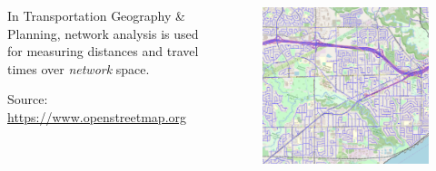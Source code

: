 \documentclass[aspectratio=169]{beamer}
\begin{document}
\begin{frame}

	
	\begin{columns}
		\begin{column}{0.5\textwidth}
			In Transportation Geography \& Planning, network analysis is used for measuring distances and travel times over \textit{network} space. \\
			\vspace{4mm}
			
			\tiny Source: \url{https://www.openstreetmap.org}
		\end{column}
		\begin{column}{0.5\textwidth}
			
			\begin{figure}
				\centering
				\includegraphics[width=1\linewidth]{images/utsc_roads_network}
			\end{figure}
			
		\end{column}
	\end{columns}
	
	
\end{frame}
\end{document}
